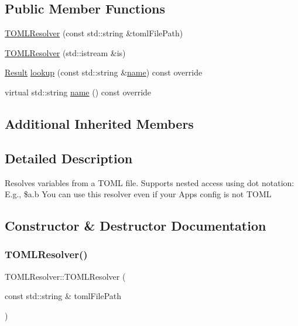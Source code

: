 \subsection*{Public Member Functions}
\begin{DoxyCompactItemize}
\item 
\hyperlink{classtheoria_1_1config_1_1TOMLResolver_a94a2659c23a5c85d05fb62e67c8c7810}{T\+O\+M\+L\+Resolver} (const std\+::string \&toml\+File\+Path)
\item 
\hyperlink{classtheoria_1_1config_1_1TOMLResolver_a2772b7d149cabddd2b622b786720420f}{T\+O\+M\+L\+Resolver} (std\+::istream \&is)
\item 
\hyperlink{classtheoria_1_1config_1_1ConfigVariableResolver_af27a85262d802c9ad4ecb1179efaf447}{Result} \hyperlink{classtheoria_1_1config_1_1TOMLResolver_a42daff166eca2c9c9dd77868faf0122d}{lookup} (const std\+::string \&\hyperlink{classtheoria_1_1config_1_1TOMLResolver_a6b50ff1e396f74183318915e602837fc}{name}) const override
\item 
virtual std\+::string \hyperlink{classtheoria_1_1config_1_1TOMLResolver_a6b50ff1e396f74183318915e602837fc}{name} () const override
\end{DoxyCompactItemize}
\subsection*{Additional Inherited Members}


\subsection{Detailed Description}
Resolves variables from a T\+O\+ML file. Supports nested access using dot notation\+: E.\+g., \$a.\+b You can use this resolver even if your App\textquotesingle{}s config is not T\+O\+ML 

\subsection{Constructor \& Destructor Documentation}
\mbox{\label{classtheoria_1_1config_1_1TOMLResolver_a94a2659c23a5c85d05fb62e67c8c7810}} 
\subsubsection{\texorpdfstring{T\+O\+M\+L\+Resolver()}{TOMLResolver()}\hspace{0.1cm}{\footnotesize\ttfamily [1/2]}}
{\footnotesize\ttfamily T\+O\+M\+L\+Resolver\+::\+T\+O\+M\+L\+Resolver (\begin{DoxyParamCaption}\item[{const std\+::string \&}]{toml\+File\+Path }\end{DoxyParamCaption})\hspace{0.3cm}{\ttfamily [explicit]}}

